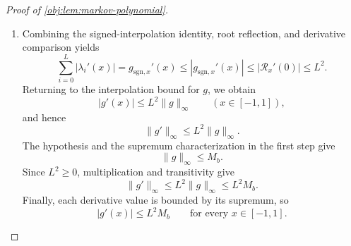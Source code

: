 \begin{proof}[Proof of \cref{obj:lem:markov-polynomial}]
\begin{enumerate}
Suppose, for a contradiction, that
\(|\mathcal R_x'(0)|>|\mathcal S'(0)|\), and define
\[
\lambda_{\mathrm{der}}:=
\frac{\mathcal R_x'(0)}{\mathcal S'(0)},
\qquad
\mathcal E_x(z):=\mathcal R_x(z)-\lambda_{\mathrm{der}}\mathcal S(z).
\]
Then
\[
|\lambda_{\mathrm{der}}|>1,\qquad \mathcal E_x'(0)=0.
\]
For \(\operatorname{Re}z\ge0\), the equality \(\mathcal E_x(z)=0\) would imply
\(\mathcal F_x(z)=\lambda_{\mathrm{der}}\), contradicting the quotient bound.
Thus every root of \(\mathcal E_x\) lies in the open left half-plane.

If \(\mathcal E_x\) is nonconstant, the Gauss--Lucas theorem places every root of its derivative in the convex hull of its roots, hence in the open left half-plane. This contradicts \(\mathcal E_x'(0)=0\).
If \(\mathcal E_x\) is constant, define
\[
c_{\mathcal E}:=\mathcal E_x(0).
\]
Then
\[
\mathcal F_x(iy)
=\lambda_{\mathrm{der}}+\frac{c_{\mathcal E}}{\mathcal S(iy)}
\longrightarrow\lambda_{\mathrm{der}}
\quad\text{as }y\to+\infty,
\]
because \(\deg\mathcal S=L>0\). The boundary bound implies
\(|\lambda_{\mathrm{der}}|\le1\), again a contradiction. We conclude that
\[
|\mathcal R_x'(0)|\le|\mathcal S'(0)|=L^2.
\]

\item Combining the signed-interpolation identity, root reflection, and derivative comparison yields
\[
\sum_{i=0}^{L}|\lambda_i'(x)|
=g_{\mathrm{sgn},x}'(x)
\le |g_{\mathrm{sgn},x}'(x)|
\le|\mathcal R_x'(0)|
\le L^2.
\]
Returning to the interpolation bound for \(g\), we obtain
\[
|g'(x)|\le L^2\|g\|_{\infty}
\qquad(x\in[-1,1]),
\]
and hence
\[
\|g'\|_{\infty}\le L^2\|g\|_{\infty}.
\]
The hypothesis and the supremum characterization in the first step give
\[
\|g\|_{\infty}\le M_b.
\]
Since \(L^2\ge0\), multiplication and transitivity give
\[
\|g'\|_{\infty}
\le L^2\|g\|_{\infty}
\le L^2M_b.
\]
Finally, each derivative value is bounded by its supremum, so
\[
|g'(x)|\le L^2M_b
\qquad\text{for every }x\in[-1,1].
\]
\end{enumerate}
\end{proof}
